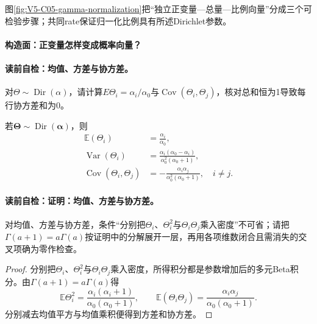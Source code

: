 图\ref{fig:V5-C05-gamma-normalization}把“独立正变量—总量—比例向量”分成三个可检验步骤；共同rate保证归一化比例具有所述Dirichlet参数。
\paragraph{构造面：正变量怎样变成概率向量？}


\paragraph{读前自检：均值、方差与协方差。}对$\Theta\sim\operatorname{Dir}(\alpha)$，请计算$E\Theta_i=\alpha_i/\alpha_0$与$\operatorname{Cov}(\Theta_i,\Theta_j)$，核对总和恒为1导致每行协方差和为0。\par

\begin{proposition}[均值、方差与协方差]\label{prop:V5-C05-basic-moments}
若$\boldsymbol\Theta\sim\operatorname{Dir}(\boldsymbol\alpha)$，则
\begin{align}
\mathbb E(\Theta_i)
&=\frac{\alpha_i}{\alpha_0},\label{eq:V5-C05-dirichlet-mean}\\
\operatorname{Var}(\Theta_i)
&=\frac{\alpha_i(\alpha_0-\alpha_i)}
{\alpha_0^2(\alpha_0+1)},\label{eq:V5-C05-dirichlet-var}\\
\operatorname{Cov}(\Theta_i,\Theta_j)
&=-\frac{\alpha_i\alpha_j}
{\alpha_0^2(\alpha_0+1)},\quad i\ne j.
\label{eq:V5-C05-dirichlet-cov}
\end{align}
\end{proposition}
\paragraph{读前自检：证明：均值、方差与协方差。}对均值、方差与协方差，条件“分别把$\Theta_i$、$\Theta_i^2$与$\Theta_i\Theta_j$乘入密度”不可省；请把$\Gamma(a+1)=a\Gamma(a)$按证明中的分解展开一层，再用各项维数闭合且需消失的交叉项确为零作检查。\par

\begin{proof}
分别把$\Theta_i$、$\Theta_i^2$与$\Theta_i\Theta_j$乘入密度，所得积分都是参数增加后的多元Beta积分。由$\Gamma(a+1)=a\Gamma(a)$得
\[
\mathbb E\Theta_i^2
=\frac{\alpha_i(\alpha_i+1)}
{\alpha_0(\alpha_0+1)},\qquad
\mathbb E(\Theta_i\Theta_j)
=\frac{\alpha_i\alpha_j}
{\alpha_0(\alpha_0+1)}.
\]
分别减去均值平方与均值乘积便得到方差和协方差。
\end{proof}

